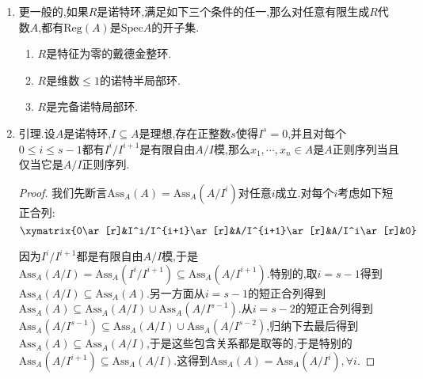 \begin{enumerate}
\begin{proof}
    	按照Nagata准则,归结为证明如果$A$还是一个整环,那么$\mathrm{Reg}(A)$包含了$\mathrm{Spec}A$的某个非空开集.我们知道代数闭域上正则和光滑是等价的,并且此时$A$总存在一个光滑闭点(比方说,域上几何既约局部有限型概形总存在正则闭点),于是此时该点附近的有限型仿射开覆盖的雅各比矩阵的秩是$n-d$,也即存在一个$n-d$阶子式在该点的剩余域里是非零的.于是存在该点的开邻域,使得这个$n-d$阶子式处处非零(因为一个数在剩余域中为零等价于落在对应的素理想里,这在素谱里是一个闭集).这就说明了$\mathrm{Reg}(A)$包含了一个非空开集.
    \end{proof}
    \item 更一般的,如果$R$是诺特环,满足如下三个条件的任一,那么对任意有限生成$R$代数$A$,都有$\mathrm{Reg}(A)$是$\mathrm{Spec}A$的开子集.
    \begin{enumerate}
    	\item $R$是特征为零的戴德金整环.
    	\item $R$是维数$\le1$的诺特半局部环.
    	\item $R$是完备诺特局部环.
    \end{enumerate}
    \item 引理.设$A$是诺特环,$I\subseteq A$是理想,存在正整数$s$使得$I^s=0$,并且对每个$0\le i\le s-1$都有$I^i/I^{i+1}$是有限自由$A/I$模,那么$x_1,\cdots,x_n\in A$是$A$正则序列当且仅当它是$A/I$正则序列.
    \begin{proof}
    	
    	我们先断言$\mathrm{Ass}_A(A)=\mathrm{Ass}_A(A/I^i)$对任意$i$成立.对每个$i$考虑如下短正合列:
    	$$\xymatrix{0\ar[r]&I^i/I^{i+1}\ar[r]&A/I^{i+1}\ar[r]&A/I^i\ar[r]&0}$$
    	
    	因为$I^i/I^{i+1}$都是有限自由$A/I$模,于是$\mathrm{Ass}_A(A/I)=\mathrm{Ass}_A(I^i/I^{i+1})\subseteq\mathrm{Ass}_A(A/I^{i+1})$.特别的,取$i=s-1$得到$\mathrm{Ass}_A(A/I)\subseteq\mathrm{Ass}_A(A)$.另一方面从$i=s-1$的短正合列得到$\mathrm{Ass}_A(A)\subseteq\mathrm{Ass}_A(A/I)\cup\mathrm{Ass}_A(A/I^{s-1})$.从$i=s-2$的短正合列得到$\mathrm{Ass}_A(A/I^{s-1})\subseteq\mathrm{Ass}_A(A/I)\cup\mathrm{Ass}_A(A/I^{s-2})$,归纳下去最后得到$\mathrm{Ass}_A(A)\subseteq\mathrm{Ass}_A(A/I)$,于是这些包含关系都是取等的,于是特别的$\mathrm{Ass}_A(A/I^{i+1})\subseteq\mathrm{Ass}_A(A/I)$.这得到$\mathrm{Ass}_A(A)=\mathrm{Ass}_A(A/I^i),\forall i$.
    	
    	\qquad
    	

\end{proof}
\end{enumerate}
